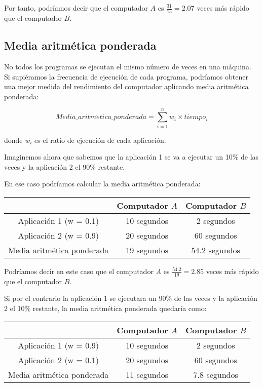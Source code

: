 \documentclass[12pt,onecolumn]{memoir}
\begin{document}
Por tanto, podríamos decir que el computador $A$ es
$\frac{31}{15}=2.07$ veces más rápido que el computador $B$.

\subsection{Media aritmética ponderada}

No todos los programas se ejecutan el mismo número de veces en una
máquina. Si supiéramos la frecuencia de ejecución de cada programa,
podríamos obtener una mejor medida del rendimiento del computador
aplicando media aritmética ponderada:

\[ Media\_aritm\acute{e}tica\_ponderada = \sum_{i=1}^{n} w_i \times tiempo_i \]

donde $w_i$ es el ratio de ejecución de cada aplicación.

Imaginemos ahora que sabemos que la aplicación 1 se va a ejecutar un
10\% de las veces y la aplicación 2 el 90\% restante.

En ese caso podríamos calcular la media aritmética ponderada:

\begin{center}
\begin{tabular}{ccc}
\hline
  & Computador $A$ & Computador $B$ \\ 
\hline
 Aplicación 1 (w = 0.1) & 10 segundos & 2 segundos \\  
 Aplicación 2 (w = 0.9) & 20 segundos & 60 segundos \\
 \hline
 Media aritmética ponderada & 19 segundos & 54.2 segundos \\
 \hline
\end{tabular}
\end{center}

Podríamos decir en este caso que el computador $A$ es
$\frac{54.2}{19}=2.85$ veces más rápido que el computador $B$.

Si por el contrario la aplicación 1 se ejecutara un
90\% de las veces y la aplicación 2 el 10\% restante, la media
aritmética ponderada quedaría como:

\begin{center}
\begin{tabular}{ccc}
\hline
  & Computador $A$ & Computador $B$ \\ 
\hline
 Aplicación 1 (w = 0.9) & 10 segundos & 2 segundos \\  
 Aplicación 2 (w = 0.1) & 20 segundos & 60 segundos \\
 \hline
 Media aritmética ponderada & 11 segundos & 7.8 segundos \\
 \hline
\end{tabular}
\end{center}
\end{document}
